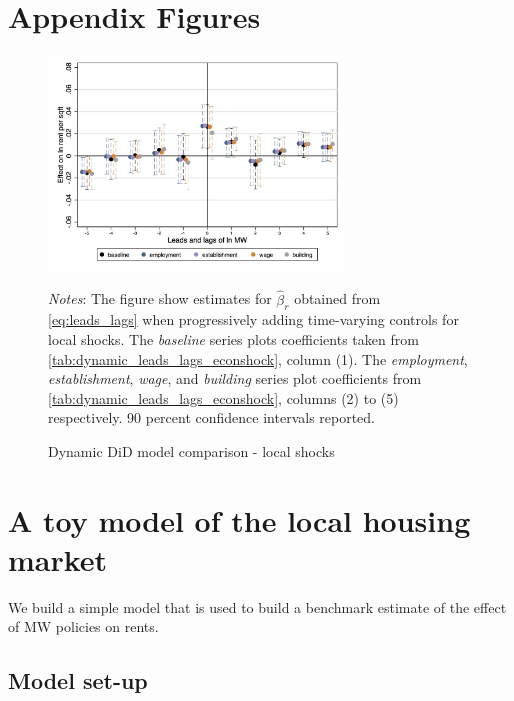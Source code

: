 \clearpage
\section{Appendix Figures}

\begin{figure}[!h]
	\caption{Dynamic DiD model comparison - local shocks}
	\label{fig:}
	\centering
	\includegraphics[width = 0.7\textwidth]{../../analysis/first_differences/output/fd_models_control.png}
	\begin{minipage}{.95\textwidth} \footnotesize
		\vspace{2mm} 
		\textit{Notes}: The figure show estimates for $\hat{\beta}_{r}$ obtained from 
		\autoref{eq:leads_lags} when progressively adding time-varying controls for local shocks. 
		The \textit{baseline} series plots coefficients taken from 
		\autoref{tab:dynamic_leads_lags_econshock}, column (1). The \textit{employment}, 
		\textit{establishment}, \textit{wage}, and \textit{building} series plot coefficients 
		from \autoref{tab:dynamic_leads_lags_econshock}, columns (2) to (5) respectively. 90 
		percent confidence intervals reported.  
	\end{minipage}
\end{figure}

\clearpage
\section{A toy model of the local housing market}\label{sec:model}

We build a simple model that is used to build a benchmark estimate of the effect of MW
policies on rents.

\subsection{Model set-up}


